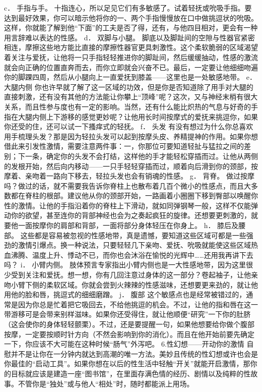 \documentclass[12pt,UTF8]{ctexbook}
\begin{document}
c． 手指与手。
十指连心，所以足见它们有多敏感了。试着轻抚或吮吸手指。要达到最好效果，你可以暗示他将你的一、两个手指慢慢放在口中做挑逗状的吮吸。这样，你就能了解到他“下面”的工夫是否了得，还有，与他四目相对，更会有一种用言辞难以表达的性感。
d． 双脚与小腿。
脚底以及脚趾间的空隙与性器官紧密相连，摩擦这些地方能比直接的摩擦性器官更具刺激性。这个柔软脆弱的区域渴望着关注与爱抚，让他将一只手指轻轻推进你的脚趾间，然后缓缓抽动，性感的激流就会向正确的位置直奔而去，而你立即就会兴奋不已。最后，一定要让他细细吻遍你的脚踝四周，然后从小腿向上一直爱抚到膝盖——这里也是一处敏感地带。
e． 大腿内侧
你也许早就了解了这一区域的功效，但是你是否知道除了用手对大腿的直接刺激，还有没有其他的方法能让你攀上“顶峰”呢？这次，又与神经末梢有很大关系，而且性参与度也有一定的影响。当然，还有什么能比炽热的气息与好奇的手指在大腿内侧上下游移的感觉更妙呢？让他用长时间按摩式的爱抚来挑逗你，如果你还受的住，还可以试一下搔痒式的轻抚。
f． 头发
有没有想过为什么你总喜欢用手梳理头发？那是因为轻拉头发可以起到按摩头皮、养精提神的作用。如果你想借此来引发性激情，需要注意两件事：一，你那位可要知道轻扯与猛拉之间的差别；下一条，确定你的头发不会打结，这样他的手才能轻松穿插而过。让他从两侧的发根开始，然后向内移动——一只手轻轻穿插而过，顺着向后滑到你的颈部，按摩着、亲吻着一路向下移去，轻拉头发也会有销魂的性感。
g． 背脊。
做过按摩吗？做过的话，就不需要我告诉你脊柱上也散布着几百个微小的性感点，而且大多数都在脊柱的根部。建议他从你的颈部开始，一路画着小圈圈下移到臀部以唤醒你性的激情。让他的手指沿着你的脊柱上下滑动，就如同弹钢琴一般，这样不仅能弹动你的欲望，甚至连你的背部神经也会为之奏起疯狂的旋律。还想要更刺激的，就要他一面按摩你的肩部和背部，一面将部分身体轻压在你身上。
h． 膝后及腰部。
这些都是容易被忽视的性感地带，真是遗憾，要知道这些区域可都是一些强劲的激情引爆点。换一种说法，只要轻轻几下亲吻、爱抚、吮吸就能使这些区域热血沸腾、温度上升、悸动不已，而你也会沐浴在愉悦的光辉中……还用我再讲下去吗？
i． 小臂内侧。
肢体预言专家指出小臂内侧也是一大性感地带，因为这里很少受到关注和爱抚。想一想，你有几回注意过身体的这一部分？卷起袖子，让他亲吻小臂下侧的柔软区域。你就会尝到火辣辣的性感滋味，还想要更来劲的，就让他用他的脸和唇，挑逗式的细细磨蹭。
j． 腹部
这个敏感点也是经常被错过的，通常是因为你总是忙着把它吸回去，不给他挑逗的机会。不过，让他的指和唇在这一带游移可是会带来别样滋味。如果你还受得住，就让他顺便“研究”一下你的肚脐（这会使你的身体轻轻颤栗）。不过，还是要提醒一句，如果他想要给你做个腹部按摩，一定要按顺时针方向（不然会影响到你的消化）。而且在他开始前要先确定一下，你应该不大可能在这种时候“肠气”外泻吧。
6.性幻想——开动你的激情
自慰并不是让你在一分钟内就达到高潮的唯一方法。美妙且传统的性幻想或许也会是你最佳的“启动工具”。如果你想在以后的性生活中轻触“开关”就能开启激情，那你的目标就应该是建造一座“图书馆”，在里面存满色情的经历、剧情以及纯粹的性故事。不管你是“独处”或与他人“相处”时，随时都能派上用场。
\end{document}
